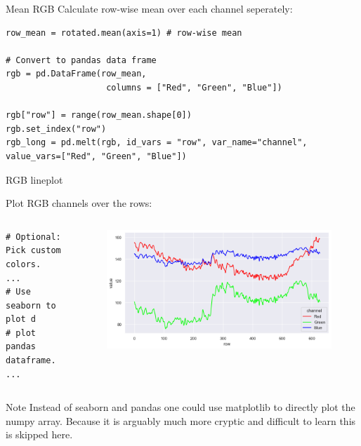 \documentclass[compress%
,aspectratio=169%
]{beamer}
\begin{document}
\begin{frame}[fragile]{Mean RGB}
Calculate row-wise mean over each channel seperately:
\begin{lstlisting}
row_mean = rotated.mean(axis=1) # row-wise mean

# Convert to pandas data frame
rgb = pd.DataFrame(row_mean,
                    columns = ["Red", "Green", "Blue"])

rgb["row"] = range(row_mean.shape[0])
rgb.set_index("row")
rgb_long = pd.melt(rgb, id_vars = "row", var_name="channel", value_vars=["Red", "Green", "Blue"])

\end{lstlisting}
\end{frame}


\begin{frame}[fragile]{RGB lineplot}

Plot RGB channels over the rows:
\begin{columns}
\begin{lstlisting}
# Optional: Pick custom colors.
...
# Use seaborn to plot d
# plot pandas dataframe.
...
\end{lstlisting}
\begin{figure}
    \centering
    \includegraphics[width = 1\linewidth]{mpimgbeamertheme/img/rgb_lines.png}
\end{figure}
\end{columns}
\begin{exampleblock} {Note}
\small
Instead of seaborn and pandas one could use matplotlib to directly plot the numpy array. Because it is arguably much more cryptic and difficult to learn this is skipped here.
\end{exampleblock}
\end{frame}
\end{document}
